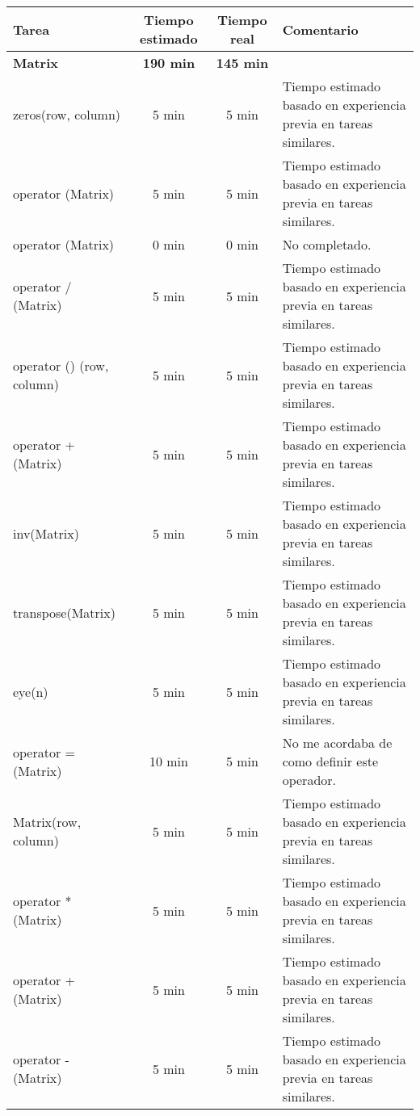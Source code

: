 \documentclass[12pt,a4paper]{article}
\begin{document}
\begin{center}
    \begin{tabular}{|p{3cm}|c|c|p{6cm}|}
        \hline
        \textbf{Tarea} & \textbf{Tiempo estimado} & \textbf{Tiempo real} & \textbf{Comentario} \\
        \hline
        \textbf{Matrix} & \textbf{190 min} & \textbf{145 min} & \\
        \hline
        zeros(row, column) & 5 min & 5 min & Tiempo estimado basado en experiencia previa en tareas similares.\\
        \hline
        operator \- (Matrix) & 5 min & 5 min & Tiempo estimado basado en experiencia previa en tareas similares.\\
        \hline
        operator \<\< (Matrix) & 0 min & 0 min & No completado. \\
        \hline
        operator / (Matrix) & 5 min & 5 min & Tiempo estimado basado en experiencia previa en tareas similares.\\
        \hline
        operator () (row, column) & 5 min & 5 min & Tiempo estimado basado en experiencia previa en tareas similares.\\
        \hline
        operator + (Matrix) & 5 min & 5 min & Tiempo estimado basado en experiencia previa en tareas similares.\\
        \hline
        inv(Matrix) & 5 min & 5 min & Tiempo estimado basado en experiencia previa en tareas similares.\\
        \hline
        transpose(Matrix) & 5 min & 5 min & Tiempo estimado basado en experiencia previa en tareas similares.\\
        \hline
        eye(n) & 5 min & 5 min & Tiempo estimado basado en experiencia previa en tareas similares.\\
        \hline
        operator = (Matrix) & 10 min & 5 min & No me acordaba de como definir este operador.\\
        \hline
        Matrix(row, column) & 5 min & 5 min & Tiempo estimado basado en experiencia previa en tareas similares.\\
        \hline
        operator * (Matrix) & 5 min & 5 min & Tiempo estimado basado en experiencia previa en tareas similares.\\
        \hline
        operator + (Matrix) & 5 min & 5 min & Tiempo estimado basado en experiencia previa en tareas similares.\\
        \hline
        operator - (Matrix) & 5 min & 5 min & Tiempo estimado basado en experiencia previa en tareas similares.\\

\end{tabular}
\end{center}
\end{document}
